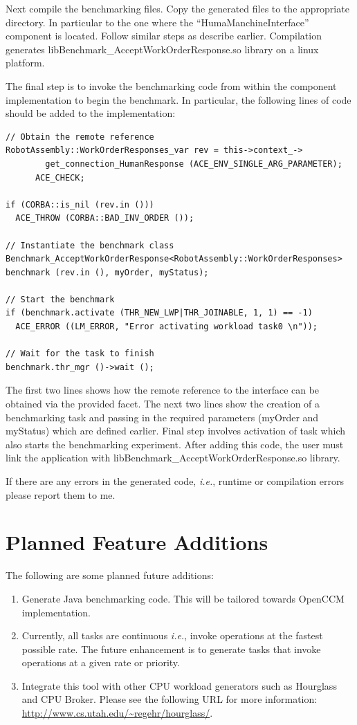 \documentclass[onecolumn]{article}
\begin{document}
Next compile the benchmarking files. Copy the generated files to the
appropriate directory. In particular to the one where the
``HumaManchineInterface'' component is located. Follow similar steps
as describe earlier. Compilation generates
libBenchmark\_AcceptWorkOrderResponse.so library on a linux platform.

The final step is to invoke the benchmarking code from within the
component implementation to begin the benchmark. In particular, the
following lines of code should be added to the implementation:

{
\footnotesize

\begin{verbatim}
// Obtain the remote reference
RobotAssembly::WorkOrderResponses_var rev = this->context_->
        get_connection_HumanResponse (ACE_ENV_SINGLE_ARG_PARAMETER);
      ACE_CHECK;

if (CORBA::is_nil (rev.in ()))
  ACE_THROW (CORBA::BAD_INV_ORDER ());

// Instantiate the benchmark class
Benchmark_AcceptWorkOrderResponse<RobotAssembly::WorkOrderResponses>
benchmark (rev.in (), myOrder, myStatus);

// Start the benchmark
if (benchmark.activate (THR_NEW_LWP|THR_JOINABLE, 1, 1) == -1)
  ACE_ERROR ((LM_ERROR, "Error activating workload task0 \n"));

// Wait for the task to finish
benchmark.thr_mgr ()->wait ();

\end{verbatim}
}

The first two lines shows how the remote reference to the interface
can be obtained via the provided facet. The next two lines show the
creation of a benchmarking task and passing in the required parameters
(myOrder and myStatus) which are defined earlier. Final step involves
activation of task which also starts the benchmarking experiment.
After adding this code, the user must link the application with
libBenchmark\_AcceptWorkOrderResponse.so library.

If there are any errors in the generated code, {\em i.e.}, runtime or
compilation errors please report them to me. 

\section* {Planned Feature Additions}
The following are some planned future additions:
\begin{enumerate}

\item Generate Java benchmarking code. This will be tailored towards
OpenCCM implementation.

\item Currently, all tasks are continuous {\em i.e.}, invoke operations at
the fastest possible rate. The future enhancement is to generate tasks
that invoke operations at a given rate or priority.

\item Integrate this tool with other CPU workload generators such as
Hourglass and CPU Broker. Please see the following URL for more
information: \url{http://www.cs.utah.edu/~regehr/hourglass/}.
\end{enumerate}
\end{document}
